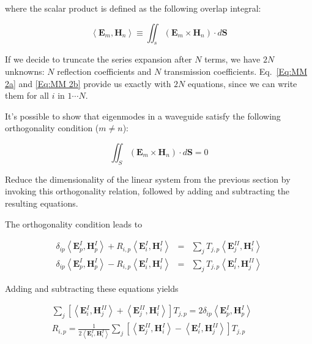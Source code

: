 \noindent{}where the scalar product is defined as the following overlap integral:

\begin{equation} 
\left\langle \mathbf{E}_{m},\mathbf{H}_{n}\right\rangle \equiv \iint _{s}\left( \mathbf{E}_{m}\times \mathbf{H}_{n}\right) \cdot d{\mathbf S}
\end{equation} 

If we decide to truncate the series expansion after $N$ terms, we have $2N$ unknowns: $N$ reflection coefficients and $N$ transmission coefficients. Eq.~\ref{Eq:MM 2a} and \ref{Eq:MM 2b} provide us exactly with $2N$ equations, since we can write them for all $i$ in $1 \cdots N$.


It's possible to show that eigenmodes in a waveguide satisfy the following orthogonality condition ($m \ne n$):

$$\iint_{S}\left( \mathbf{E}_{m}\times \mathbf{H}_{n}\right) \cdot d{\mathbf S}=0$$

\begin{cue}
Reduce the dimensionality of the linear system from the previous section by invoking this orthogonality relation, followed by adding and subtracting the resulting equations.
\end{cue}

The orthogonality condition leads to
  
\begin{eqnarray}
\delta _{ip}\left\langle \mathbf{E}^{I}_{p},\mathbf{H}^{I}_{p}\right\rangle +R_{i,p}\left\langle \mathbf{E}^{I}_{i},\mathbf{H}^{I}_{i}\right\rangle  & = & \sum _{j}T_{j,p}\left\langle \mathbf{E}^{II}_{j},\mathbf{H}^{I}_{i}\right\rangle \label{Eq:MM 3a} \\
\delta _{ip}\left\langle \mathbf{E}^{I}_{p},\mathbf{H}^{I}_{p}\right\rangle -R_{i,p}\left\langle \mathbf{E}^{I}_{i},\mathbf{H}^{I}_{i}\right\rangle  & = & \sum _{j}T_{j,p}\left\langle \mathbf{E}^{I}_{i},\mathbf{H}^{II}_{j}\right\rangle \label{Eq:MM 3b} 
\end{eqnarray}

Adding and subtracting these equations yields

\begin{eqnarray}
\sum _{j}\left[ \left\langle \mathbf{E}^{I}_{i},\mathbf{H}^{II}_{j}\right\rangle +\left\langle \mathbf{E}^{II}_{j},\mathbf{H}^{I}_{i}\right\rangle \right] T_{j,p}=2\delta _{ip}\left\langle \mathbf{E}^{I}_{p},\mathbf{H}^{I}_{p}\right\rangle  &  & \label{Eq:MM 4a} \\
R_{i,p}=\frac{1}{2\left\langle \mathbf{E}^{I}_{i},\mathbf{H}^{I}_{i}\right\rangle }\sum _{j}\left[ \left\langle \mathbf{E}^{II}_{j},\mathbf{H}^{I}_{i}\right\rangle -\left\langle \mathbf{E}^{I}_{i},\mathbf{H}^{II}_{j}\right\rangle \right] T_{j,p} &  & \label{Eq:MM 4b} 
\end{eqnarray}

